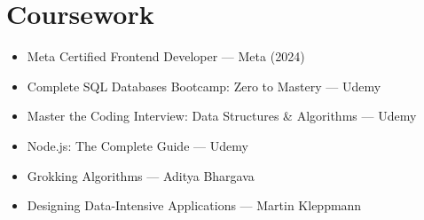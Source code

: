 \documentclass[10pt, a4paper]{article}
\begin{document}
\section{Coursework}
\begin{itemize}
\item Meta Certified Frontend Developer — Meta (2024)
\item Complete SQL Databases Bootcamp: Zero to Mastery — Udemy
\item Master the Coding Interview: Data Structures \& Algorithms — Udemy
\item Node.js: The Complete Guide — Udemy
\item Grokking Algorithms — Aditya Bhargava
\item Designing Data-Intensive Applications — Martin Kleppmann
\end{itemize}
\end{document}
